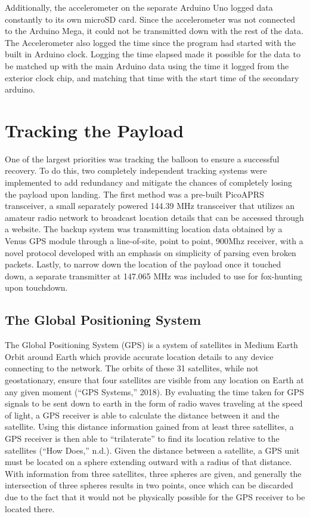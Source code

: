 \documentclass[12pt,]{article}
\begin{document}
Additionally, the accelerometer on the separate Arduino Uno logged data
constantly to its own microSD card. Since the accelerometer was not
connected to the Arduino Mega, it could not be transmitted down with the
rest of the data. The Accelerometer also logged the time since the
program had started with the built in Arduino clock. Logging the time
elapsed made it possible for the data to be matched up with the main
Arduino data using the time it logged from the exterior clock chip, and
matching that time with the start time of the secondary arduino.

\section{Tracking the Payload}\label{tracking-the-payload}

One of the largest priorities was tracking the balloon to ensure a
successful recovery. To do this, two completely independent tracking
systems were implemented to add redundancy and mitigate the chances of
completely losing the payload upon landing. The first method was a
pre-built PicoAPRS transceiver, a small separately powered 144.39 MHz
transceiver that utilizes an amateur radio network to broadcast location
details that can be accessed through a website. The backup system was
transmitting location data obtained by a Venus GPS module through a
line-of-site, point to point, 900Mhz receiver, with a novel protocol
developed with an emphasis on simplicity of parsing even broken packets.
Lastly, to narrow down the location of the payload once it touched down,
a separate transmitter at 147.065 MHz was included to use for
fox-hunting upon touchdown.

\subsection{The Global Positioning
System}\label{the-global-positioning-system}

The Global Positioning System (GPS) is a system of satellites in Medium
Earth Orbit around Earth which provide accurate location details to any
device connecting to the network. The orbits of these 31 satellites,
while not geostationary, ensure that four satellites are visible from
any location on Earth at any given moment (``GPS Systems,'' 2018). By
evaluating the time taken for GPS signals to be sent down to earth in
the form of radio waves traveling at the speed of light, a GPS receiver
is able to calculate the distance between it and the satellite. Using
this distance information gained from at least three satellites, a GPS
receiver is then able to ``trilaterate'' to find its location relative
to the satellites (``How Does,'' n.d.). Given the distance between a
satellite, a GPS unit must be located on a sphere extending outward with
a radius of that distance. With information from three satellites, three
spheres are given, and generally the intersection of three spheres
results in two points, once which can be discarded due to the fact that
it would not be physically possible for the GPS receiver to be located
there.
\end{document}
